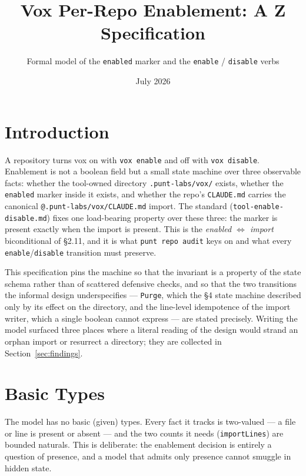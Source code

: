 \documentclass[a4paper,10pt,fleqn]{article}
\begin{document}
\title{Vox Per-Repo Enablement: A Z Specification}
\author{Formal model of the \texttt{enabled} marker and the \texttt{enable} /
  \texttt{disable} verbs}
\date{July 2026}
\maketitle

\tableofcontents
\newpage

\section{Introduction}

A repository turns vox on with \texttt{vox enable} and off with
\texttt{vox disable}. Enablement is not a boolean field but a small state
machine over three observable facts: whether the tool-owned directory
\texttt{.punt-labs/vox/} exists, whether the \texttt{enabled} marker inside it
exists, and whether the repo's \texttt{CLAUDE.md} carries the canonical
\texttt{@.punt-labs/vox/CLAUDE.md} import. The standard
(\texttt{tool-enable-disable.md}) fixes one load-bearing property over these
three: the marker is present exactly when the import is present. This is the
\emph{enabled $\iff$ import} biconditional of \S2.11, and it is what
\texttt{punt repo audit} keys on and what every \texttt{enable}/\texttt{disable}
transition must preserve.

This specification pins the machine so that the invariant is a property of the
state schema rather than of scattered defensive checks, and so that the two
transitions the informal design underspecifies --- \texttt{Purge}, which the
\S4 state machine described only by its effect on the directory, and the
line-level idempotence of the import writer, which a single boolean cannot
express --- are stated precisely. Writing the model surfaced three places where
a literal reading of the design would strand an orphan import or resurrect a
directory; they are collected in Section~\ref{sec:findings}.

\section{Basic Types}

The model has no basic (given) types. Every fact it tracks is two-valued --- a
file or line is present or absent --- and the two counts it needs
(\texttt{importLines}) are bounded naturals. This is deliberate: the enablement
decision is entirely a question of presence, and a model that admits only
presence cannot smuggle in hidden state.
\end{document}
